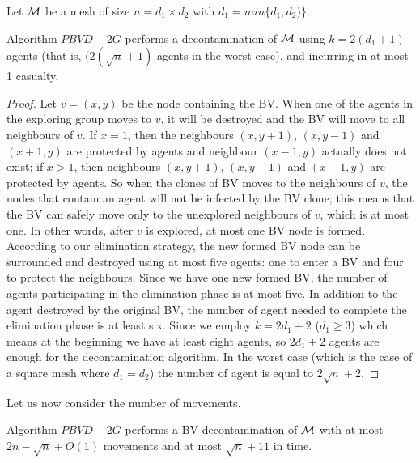 
Let ${\cal M}$ be a mesh of size   $n=d_1\times d_2$  with $d_1=min\{d_1, d_2)\}$.
 
\begin{theorem}
Algorithm $PBVD-2G$  performs a decontamination of  ${\cal M}$  
 using $k=2(d_1+1)$  agents (that is, $(2(\sqrt{n}+1)$ agents   in the worst case),
 and incurring in at most 1 casualty. 
\end{theorem}
\begin{proof}
Let $v=(x, y)$ be the node containing the BV. When one of the agents in the exploring group moves to $v$, it will be destroyed and the BV will move to all neighbours of $v$. If $x=1$, then the neighbours $(x, y+1)$, $(x, y-1)$ and $(x+1, y)$ are protected by agents and neighbour $(x-1, y)$ actually does not exist; if $x>1$, then neighbours $(x, y+1)$, $(x, y-1)$ and $(x-1, y)$ are protected by agents. So when the clones of BV moves to the neighbours of $v$, the nodes that contain an agent will not be infected by the BV clone; this means that the BV can safely move only to the unexplored neighbours of $v$,   which is at most one. In other words, after $v$ is explored, at most one BV node is formed. According to our elimination strategy, the new formed BV node can be surrounded and destroyed using at most five agents: one to enter a BV and four to protect the neighbours. Since we have one new formed BV, the number of agents participating in the elimination phase is at most five. In addition to the agent destroyed by the original BV, the number of agent needed to complete the elimination phase is at least six. Since we employ $k=2d_1+2$ ($d_1\geq 3$) which means at the beginning we have at least eight agents, so $2d_1+2$ agents are enough for the decontamination algorithm. In the worst case (which is the case of a  square mesh where $d_1=d_2$) the number of agent is equal to $2\sqrt{n}+2$.
\end{proof}
Let us now consider the number of movements.
\begin{theorem}
Algorithm $PBVD-2G$  performs a BV decontamination  of ${\cal M}$ with at most $2n-\sqrt{n}+O(1)$ movements and at most $\sqrt{n}+11$ in time.
\end{theorem}
